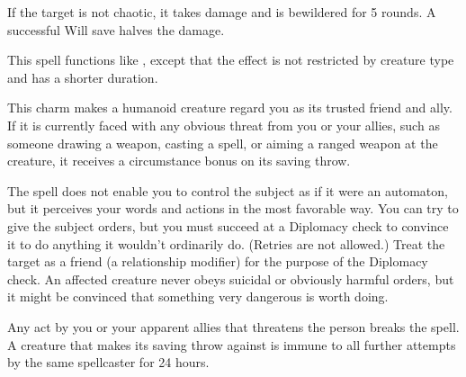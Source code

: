 \spellrng{\rngmed}
\begin{spelleffect}
  If the target is not chaotic, it takes damage and is bewildered for 5 rounds. A successful Will save halves the damage.
\end{spelleffect}

\begin{spelleffect}
  This spell functions like , except that the effect is not restricted by creature type and has a shorter duration.
\end{spelleffect}

\spellrng{\rngmed}
\spelldur{\durlong}
\begin{spelleffect}
  This charm makes a humanoid creature regard you as its trusted friend and ally. If it is currently faced with any obvious threat from you or your allies, such as someone drawing a weapon, casting a spell, or aiming a ranged weapon at the creature, it receives a  circumstance bonus on its saving throw.
  \par The spell does not enable you to control the subject as if it were an automaton, but it perceives your words and actions in the most favorable way. You can try to give the subject orders, but you must succeed at a Diplomacy check to convince it to do anything it wouldn't ordinarily do. (Retries are not allowed.) Treat the target as a friend (a  relationship modifier) for the purpose of the Diplomacy check. An affected creature never obeys suicidal or obviously harmful orders, but it might be convinced that something very dangerous is worth doing.
\end{spelleffect}
\begin{spellnotes}
  Any act by you or your apparent allies that threatens the  person breaks the spell. A creature that makes its saving throw against  is immune to all further attempts by the same spellcaster for 24 hours.
\end{spellnotes}

